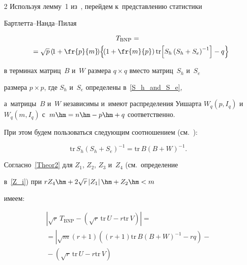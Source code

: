 \begin{multicols}{2}
Используя лемму~1 из~\cite{lit:WFU}, перейдем к~представлению статистики 


Барт\-лет\-та--Нан\-да--Пи\-лая


\begin{multline*}


T_{\mathrm{BNP}}={}\\


{}=\sqrt{p}\left(\!1+\fr{p}{m}\!\right)\!\left\{\!\left(1+\fr{m}{p}\right)\mathrm{tr}\!\left[S_{h}


\left(S_{h}+S_{e}\right)^{-1}\right]-q\right\}\hspace*{-4.9pt}


\end{multline*}


в терминах матриц~$B$ и~$W$ размера $q \times q$ вместо матриц~$S_{h}$ и~$S_{e}$ 


размера $p \times p$, где $S_{h}$ и~$S_{e}$ определены в~\eqref{S_h_and_S_e}, 


а~матрицы~$B$ и~$W$ независимы и~имеют распределения Уишарта $W_{q}\left(p, 


I_{q}\right)$ и~$W_{q}\left(m, I_{q}\right)$ с~$m\hm=n\hm-p\hm+q$ соответственно.


При этом будем пользоваться сле\-ду\-ющим соотношением (см.~\cite{lit:WFU}):


$$


\mathrm{tr}\,{S_{h}\left(S_{h}+S_{e}\right)^{-1}}=


\mathrm{tr}\,{B\left(B+W\right)^{-1}}.


$$





Согласно~\eqref{Theor2} для $Z_1$, $Z_2$, $Z_3$ и~$Z_4$ (см.\ определение 


в~\eqref{Z_i}) при $rZ_{4}\hm+2\sqrt{r}\left|Z_{1}\right|\hm+Z_{2} \hm< m$ 


имеем:


\begin{multline*}




|\sqrt{r}\,T_{\mathrm{BNP}} - \left(\sqrt{r}\,\mathrm{tr}\,{U}-r\mathrm{tr}\,{V}\right)|={}\\


{}= \left|\sqrt{m}\left(r+1\right)\left(\left(r+1\right)\mathrm{tr}\,{B\left(B+W\right)^{-1}}


-rq\right)-{}\right.\\


\left.{}-\left(\sqrt{r}\,\mathrm{tr}\,{U}-r\mathrm{tr}\,{V}\right)



\end{multline*}
\end{multicols}
